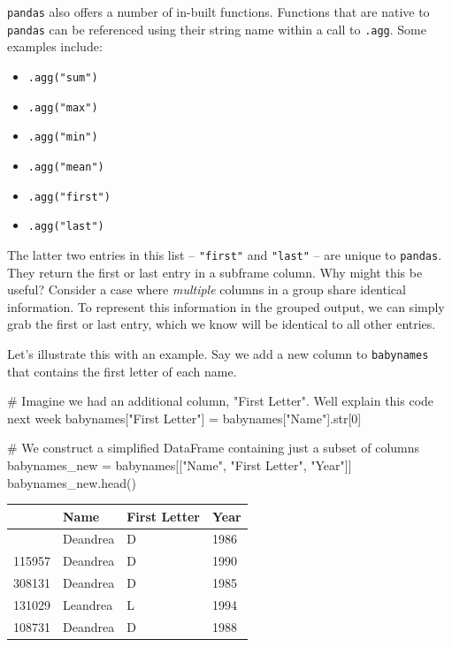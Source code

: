 \documentclass[
  letterpaper,
  DIV=11,
  numbers=noendperiod]{scrreprt}
\newenvironment{Shaded}{\begin{snugshade}}{\end{snugshade}}
\newcommand{\BuiltInTok}[1]{\textcolor[rgb]{0.00,0.23,0.31}{#1}}
\newcommand{\CommentTok}[1]{\textcolor[rgb]{0.37,0.37,0.37}{#1}}
\newcommand{\DecValTok}[1]{\textcolor[rgb]{0.68,0.00,0.00}{#1}}
\newcommand{\NormalTok}[1]{\textcolor[rgb]{0.00,0.23,0.31}{#1}}
\newcommand{\OperatorTok}[1]{\textcolor[rgb]{0.37,0.37,0.37}{#1}}
\newcommand{\StringTok}[1]{\textcolor[rgb]{0.13,0.47,0.30}{#1}}
\providecommand{\tightlist}{%
  \setlength{\itemsep}{0pt}\setlength{\parskip}{0pt}}\usepackage{longtable,booktabs,array}
\begin{document}
\texttt{pandas} also offers a number of in-built functions. Functions
that are native to \texttt{pandas} can be referenced using their string
name within a call to \texttt{.agg}. Some examples include:

\begin{itemize}
\tightlist
\item
  \texttt{.agg("sum")}
\item
  \texttt{.agg("max")}
\item
  \texttt{.agg("min")}
\item
  \texttt{.agg("mean")}
\item
  \texttt{.agg("first")}
\item
  \texttt{.agg("last")}
\end{itemize}

The latter two entries in this list -- \texttt{"first"} and
\texttt{"last"} -- are unique to \texttt{pandas}. They return the first
or last entry in a subframe column. Why might this be useful? Consider a
case where \emph{multiple} columns in a group share identical
information. To represent this information in the grouped output, we can
simply grab the first or last entry, which we know will be identical to
all other entries.

Let's illustrate this with an example. Say we add a new column to
\texttt{babynames} that contains the first letter of each name.

\begin{Shaded}
\begin{Highlighting}[]
\CommentTok{\# Imagine we had an additional column, "First Letter". We\textquotesingle{}ll explain this code next week}
\NormalTok{babynames[}\StringTok{"First Letter"}\NormalTok{] }\OperatorTok{=}\NormalTok{ babynames[}\StringTok{"Name"}\NormalTok{].}\BuiltInTok{str}\NormalTok{[}\DecValTok{0}\NormalTok{]}

\CommentTok{\# We construct a simplified DataFrame containing just a subset of columns}
\NormalTok{babynames\_new }\OperatorTok{=}\NormalTok{ babynames[[}\StringTok{"Name"}\NormalTok{, }\StringTok{"First Letter"}\NormalTok{, }\StringTok{"Year"}\NormalTok{]]}
\NormalTok{babynames\_new.head()}
\end{Highlighting}
\end{Shaded}

\begin{longtable}[]{@{}llll@{}}
\toprule\noalign{}
& Name & First Letter & Year \\
\midrule\noalign{}
\endhead
\bottomrule\noalign{}
\endlastfoot
101976 & Deandrea & D & 1986 \\
115957 & Deandrea & D & 1990 \\
308131 & Deandrea & D & 1985 \\
131029 & Leandrea & L & 1994 \\
108731 & Deandrea & D & 1988 \\
\end{longtable}
\end{document}
